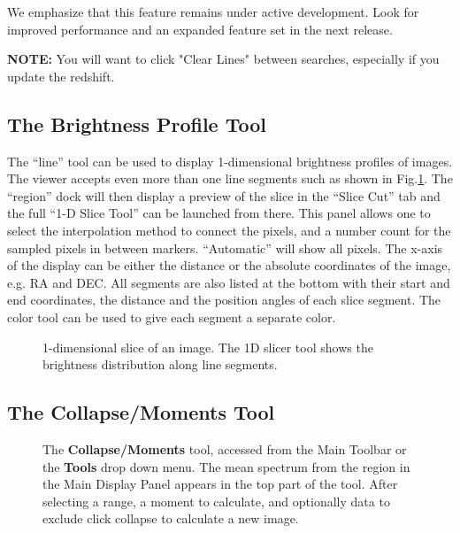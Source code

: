We emphasize that this feature remains under active development. Look for improved performance and an expanded feature set in the next release.

{\bf NOTE:} You will want to click "Clear Lines" between searches, especially if you update the redshift.


\subsection{The Brightness Profile Tool}
\label{section:display.image.bprofile}

The ``line'' tool can be used to display 1-dimensional brightness
profiles of images. The viewer accepts even more than one line
segments such as shown in Fig.\ref{fig:viewer_slicer}. The ``region''
dock will then display a preview of the slice in the ``Slice Cut'' tab
and the full ``1-D Slice Tool'' can be launched from there. This panel
allows one to select the interpolation method to connect the pixels,
and a number count for the sampled pixels in between
markers. ``Automatic'' will show all pixels. The x-axis of the display can
be either the distance or the absolute coordinates of the image,
e.g. RA and DEC. All segments are also listed at the bottom with their
start and end coordinates, the distance and the position angles of each
slice segment. The color tool can be used to give each segment a
separate color. 

\begin{figure}[h!]
\begin{center}
\caption{\label{fig:viewer_slicer} 1-dimensional slice of an
  image. The 1D slicer tool shows the brightness distribution along
  line segments.} 
\hrulefill
\end{center}
\end{figure}


\subsection{The Collapse/Moments Tool}
\label{section:display.image.collapse}

\begin{figure}[h!]
\begin{center}
\caption{\label{fig:viewer_collapse} The {\bf Collapse/Moments} tool, accessed from
the Main Toolbar or the {\bf Tools} drop down menu. The mean spectrum from the region 
in the Main Display Panel appears in the top part of the tool. After selecting a range,
a moment to calculate, and optionally data to exclude click collapse to calculate a new image.}
\hrulefill
\end{center}
\end{figure}


